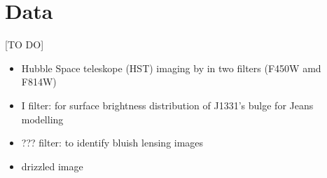 \section{Data}

[TO DO]

\begin{itemize}
\item Hubble Space teleskope (HST) imaging by \cite{SWELLSI} in two filters (F450W amd F814W)
\item I filter: for surface brightness distribution of J1331's bulge for Jeans modelling
\item ??? filter: to identify bluish lensing images
\item drizzled image
\end{itemize}